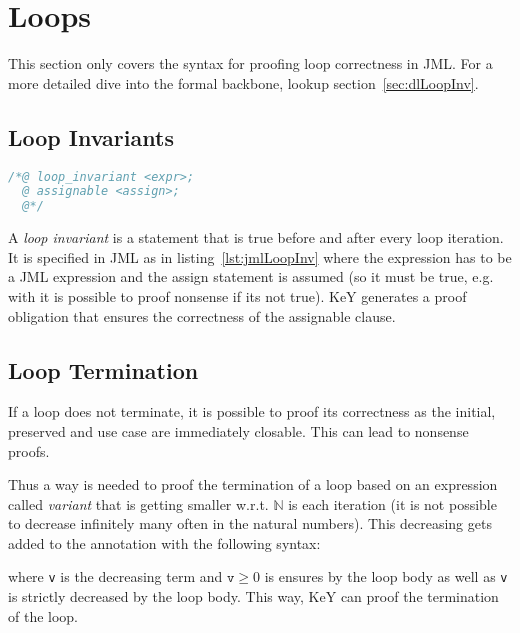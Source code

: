	\section{Loops}
		This section only covers the syntax for proofing loop correctness in JML. For a more detailed dive into the formal backbone, lookup section~\ref{sec:dlLoopInv}.

		\subsection{Loop Invariants}
			\label{sec:loopinv}

			\begin{lstlisting}[caption = { Loop Invariants in JML }, label = lst:jmlLoopInv, language = Java]
/*@ loop_invariant <expr>;
  @ assignable <assign>;
  @*/
			\end{lstlisting}

			A \textit{loop invariant} is a statement that is true before and after every loop iteration. It is specified in JML as in listing~\ref{lst:jmlLoopInv} where the expression has to be a  JML expression and the assign statement is assumed (so it must be true, e.g. with  it is possible to proof nonsense if its not true). KeY generates a proof obligation that ensures the correctness of the assignable clause.

		\subsection{Loop Termination}
			If a loop does not terminate, it is possible to proof its correctness as the initial, preserved and use case are immediately closable. This can lead to nonsense proofs.

			Thus a way is needed to proof the termination of a loop based on an expression called \textit{variant} that is getting smaller w.r.t. \( \mathbb{N} \) is each iteration (it is not possible to decrease infinitely many often in the natural numbers). This decreasing gets added to the  annotation with the following syntax:
			\begin{center}
			\end{center}
			where \texttt{v} is the decreasing term and \( \texttt{v} \geq 0 \) is ensures by the loop body as well as \texttt{v} is strictly decreased by the loop body. This way, KeY can proof the termination of the loop.

